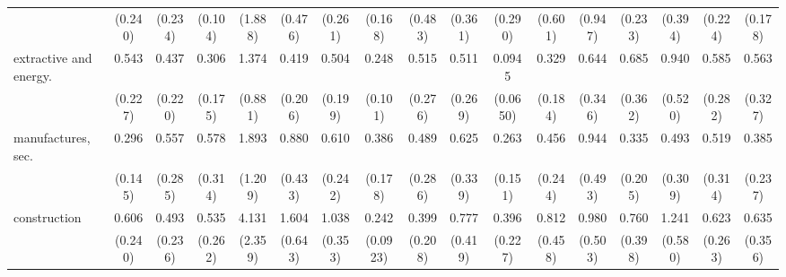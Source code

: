 {\begin{tabular}{l*{16}{c}}
                    &     (0.240)         &     (0.234)         &     (0.104)         &     (1.888)         &     (0.476)         &     (0.261)         &     (0.168)         &     (0.483)         &     (0.361)         &     (0.290)         &     (0.601)         &     (0.947)         &     (0.233)         &     (0.394)         &     (0.224)         &     (0.178)         \\
[1em]
extractive and energy.&       0.543         &       0.437         &       0.306\sym{*}  &       1.374         &       0.419         &       0.504         &       0.248\sym{***}&       0.515         &       0.511         &      0.0945\sym{***}&       0.329\sym{*}  &       0.644         &       0.685         &       0.940         &       0.585         &       0.563         \\
                    &     (0.227)         &     (0.220)         &     (0.175)         &     (0.881)         &     (0.206)         &     (0.199)         &     (0.101)         &     (0.276)         &     (0.269)         &    (0.0650)         &     (0.184)         &     (0.346)         &     (0.362)         &     (0.520)         &     (0.282)         &     (0.327)         \\
[1em]
manufactures, sec.  &       0.296\sym{*}  &       0.557         &       0.578         &       1.893         &       0.880         &       0.610         &       0.386\sym{*}  &       0.489         &       0.625         &       0.263\sym{*}  &       0.456         &       0.944         &       0.335         &       0.493         &       0.519         &       0.385         \\
                    &     (0.145)         &     (0.285)         &     (0.314)         &     (1.209)         &     (0.433)         &     (0.242)         &     (0.178)         &     (0.286)         &     (0.339)         &     (0.151)         &     (0.244)         &     (0.493)         &     (0.205)         &     (0.309)         &     (0.314)         &     (0.237)         \\
[1em]
construction        &       0.606         &       0.493         &       0.535         &       4.131\sym{*}  &       1.604         &       1.038         &       0.242\sym{***}&       0.399         &       0.777         &       0.396         &       0.812         &       0.980         &       0.760         &       1.241         &       0.623         &       0.635         \\
                    &     (0.240)         &     (0.236)         &     (0.262)         &     (2.359)         &     (0.643)         &     (0.353)         &    (0.0923)         &     (0.208)         &     (0.419)         &     (0.227)         &     (0.458)         &     (0.503)         &     (0.398)         &     (0.580)         &     (0.263)         &     (0.356)         \\

\end{tabular}}
